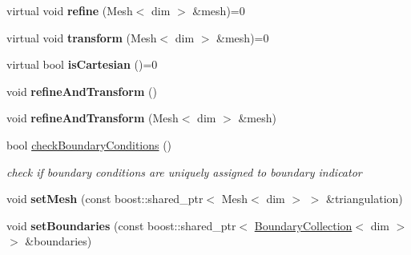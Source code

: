 \begin{DoxyCompactItemize}
\item 
\hypertarget{classnatrium_1_1ProblemDescription_ac60c308fbab126339ec08e2377fc77bb}{
virtual void {\bfseries refine} (Mesh$<$ dim $>$ \&mesh)=0}
\label{classnatrium_1_1ProblemDescription_ac60c308fbab126339ec08e2377fc77bb}

\item 
\hypertarget{classnatrium_1_1ProblemDescription_aedee850a39034390229f3e1131b00fad}{
virtual void {\bfseries transform} (Mesh$<$ dim $>$ \&mesh)=0}
\label{classnatrium_1_1ProblemDescription_aedee850a39034390229f3e1131b00fad}

\item 
\hypertarget{classnatrium_1_1ProblemDescription_a24522da7068f2c566044936085b14369}{
virtual bool {\bfseries isCartesian} ()=0}
\label{classnatrium_1_1ProblemDescription_a24522da7068f2c566044936085b14369}

\item 
\hypertarget{classnatrium_1_1ProblemDescription_a9487f2c9b6f6845d1eac886470b91457}{
void {\bfseries refineAndTransform} ()}
\label{classnatrium_1_1ProblemDescription_a9487f2c9b6f6845d1eac886470b91457}

\item 
\hypertarget{classnatrium_1_1ProblemDescription_aa8ca60598929e469f18e5ebf37d2ad6e}{
void {\bfseries refineAndTransform} (Mesh$<$ dim $>$ \&mesh)}
\label{classnatrium_1_1ProblemDescription_aa8ca60598929e469f18e5ebf37d2ad6e}

\item 
bool \hyperlink{classnatrium_1_1ProblemDescription_aed8ec93fcba6c0b78c04ef91b8703f7a}{checkBoundaryConditions} ()
\begin{DoxyCompactList}\small\item\em check if boundary conditions are uniquely assigned to boundary indicator \item\end{DoxyCompactList}\item 
\hypertarget{classnatrium_1_1ProblemDescription_afeb7e2a712c3fb816d8491cb01d02156}{
void {\bfseries setMesh} (const boost::shared\_\-ptr$<$ Mesh$<$ dim $>$ $>$ \&triangulation)}
\label{classnatrium_1_1ProblemDescription_afeb7e2a712c3fb816d8491cb01d02156}

\item 
\hypertarget{classnatrium_1_1ProblemDescription_a9078dc3c0da45f600e8b2375f321494e}{
void {\bfseries setBoundaries} (const boost::shared\_\-ptr$<$ \hyperlink{classnatrium_1_1BoundaryCollection}{BoundaryCollection}$<$ dim $>$ $>$ \&boundaries)}
\label{classnatrium_1_1ProblemDescription_a9078dc3c0da45f600e8b2375f321494e}


\end{DoxyCompactItemize}
